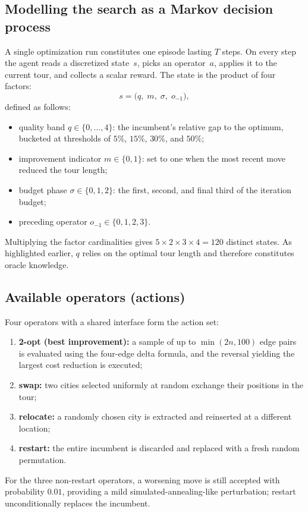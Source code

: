 \documentclass[10pt,twocolumn]{article}
\begin{document}
\subsection{Modelling the search as a Markov decision process}
A single optimization run constitutes one episode lasting $T$ steps. On every
step the agent reads a discretized state~$s$, picks an operator~$a$, applies it
to the current tour, and collects a scalar reward. The state is the product of
four factors:
\[
s = \bigl(q,\; m,\; \sigma,\; o_{-1}\bigr),
\]
defined as follows:
\begin{itemize}\itemsep0.1em
  \item quality band $q\in\{0,\dots,4\}$: the incumbent's relative gap to the
        optimum, bucketed at thresholds of $5\%$, $15\%$, $30\%$, and $50\%$;
  \item improvement indicator $m\in\{0,1\}$: set to one when the most recent
        move reduced the tour length;
  \item budget phase $\sigma\in\{0,1,2\}$: the first, second, and final third
        of the iteration budget;
  \item preceding operator $o_{-1}\in\{0,1,2,3\}$.
\end{itemize}
Multiplying the factor cardinalities gives $5\times2\times3\times4 = 120$
distinct states. As highlighted earlier, $q$ relies on the optimal tour length
and therefore constitutes oracle knowledge.

\subsection{Available operators (actions)}
Four operators with a shared interface form the action set:
\begin{enumerate}\itemsep0.1em
  \item \textbf{2-opt (best improvement):} a sample of up to $\min(2n,100)$
        edge pairs is evaluated using the four-edge delta formula, and the
        reversal yielding the largest cost reduction is executed;
  \item \textbf{swap:} two cities selected uniformly at random exchange their
        positions in the tour;
  \item \textbf{relocate:} a randomly chosen city is extracted and reinserted
        at a different location;
  \item \textbf{restart:} the entire incumbent is discarded and replaced with
        a fresh random permutation.
\end{enumerate}
For the three non-restart operators, a worsening move is still accepted with
probability $0.01$, providing a mild simulated-annealing-like perturbation;
restart unconditionally replaces the incumbent.
\end{document}
